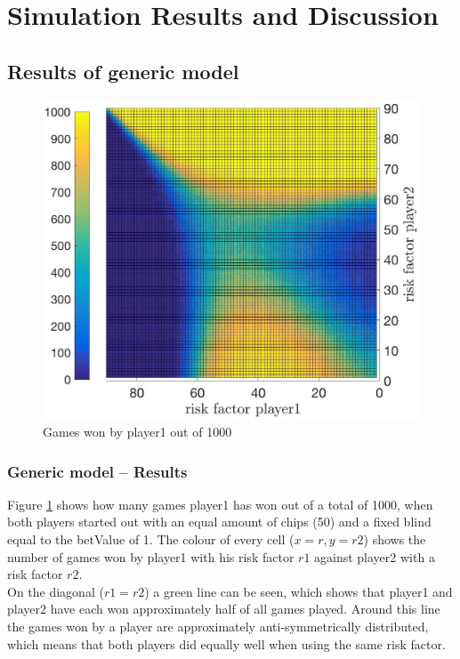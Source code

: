 \documentclass[11pt]{article}
\begin{document}
\section{Simulation Results and Discussion}

\subsection{Results of generic model}

\begin{figure}
\begin{center}
\includegraphics[scale=0.2]{Graphics/allDataPlot_BlindOn_1000Games_001Step_TopFlat.jpg}
\caption{Games won by player1 out of 1000\label{Topview of all Data}}
\end{center}
\end{figure}

\subsubsection{Generic model -- Results }
Figure \ref{Topview of all Data} shows how many games player1 has won out of a total of 1000, when both players started out with an equal amount of chips (50) and a fixed blind equal to the betValue of 1. The colour of every cell ($x=r, y=r2$) shows the number of games won by player1 with his risk factor $r1$ against player2 with a risk factor $r2$.\\
% 

On the diagonal ($r1=r2$) a green line can be seen, which shows that player1 and player2 have each won approximately half of all games played. Around this line the games won by a player are approximately anti-symmetrically distributed, which means that both players did equally well when using the same risk factor.\\
\end{document}
